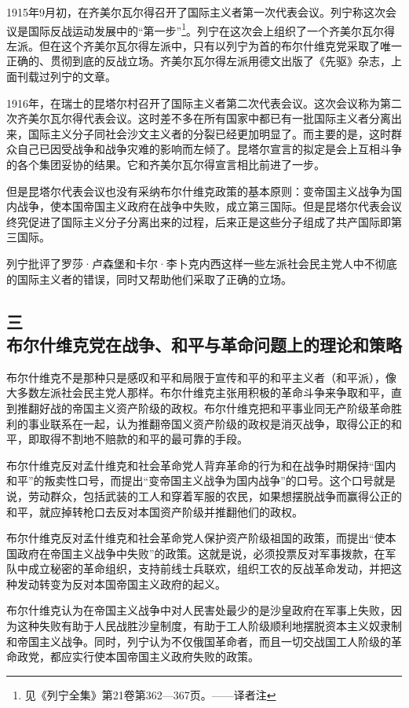 1915年9月初，在齐美尔瓦尔得召开了国际主义者第一次代表会议。列宁称这次会议是国际反战运动发展中的“第一步”\footnote{见《列宁全集》第21卷第362—367页。——译者注}。列宁在这次会上组织了一个齐美尔瓦尔得左派。但在这个齐美尔瓦尔得左派中，只有以列宁为首的布尔什维克党采取了唯一正确的、贯彻到底的反战立场。齐美尔瓦尔得左派用德文出版了《先驱》杂志，上面刊载过列宁的文章。

1916年，在瑞士的昆塔尔村召开了国际主义者第二次代表会议。这次会议称为第二次齐美尔瓦尔得代表会议。这时差不多在所有国家中都已有一批国际主义者分离出来，国际主义分子同社会沙文主义者的分裂已经更加明显了。而主要的是，这时群众自己已因受战争和战争灾难的影响而左倾了。昆塔尔宣言的拟定是会上互相斗争的各个集团妥协的结果。它和齐美尔瓦尔得宣言相比前进了一步。

但是昆塔尔代表会议也没有采纳布尔什维克政策的基本原则：变帝国主义战争为国内战争，使本国帝国主义政府在战争中失败，成立第三国际。但是昆塔尔代表会议终究促进了国际主义分子分离出来的过程，后来正是这些分子组成了共产国际即第三国际。

列宁批评了罗莎·卢森堡和卡尔·李卜克内西这样一些左派社会民主党人中不彻底的国际主义者的错误，同时又帮助他们采取了正确的立场。


\subsection[三\q 布尔什维克党在战争、和平与革命问题上的理论和策略]{三\\布尔什维克党在战争、和平与革命问题上的理论和策略}

布尔什维克不是那种只是感叹和平和局限于宣传和平的和平主义者（和平派），像大多数左派社会民主党人那样。布尔什维克主张用积极的革命斗争来争取和平，直到推翻好战的帝国主义资产阶级的政权。布尔什维克把和平事业同无产阶级革命胜利的事业联系在一起，认为推翻帝国义资产阶级的政权是消灭战争，取得公正的和平，即取得不割地不赔款的和平的最可靠的手段。

布尔什维克反对孟什维克和社会革命党人背弃革命的行为和在战争时期保持“国内和平”的叛卖性口号，而提出“变帝国主义战争为国内战争”的口号。这个口号就是说，劳动群众，包括武装的工人和穿着军服的农民，如果想摆脱战争而赢得公正的和平，就应掉转枪口去反对本国资产阶级并推翻他们的政权。

布尔什维克反对孟什维克和社会革命党人保护资产阶级祖国的政策，而提出“使本国政府在帝国主义战争中失败”的政策。这就是说，必须投票反对军事拨款，在军队中成立秘密的革命组织，支持前线士兵联欢，组织工农的反战革命发动，并把这种发动转变为反对本国帝国主义政府的起义。

布尔什维克认为在帝国主义战争中对人民害处最少的是沙皇政府在军事上失败，因为这种失败有助于人民战胜沙皇制度，有助于工人阶级顺利地摆脱资本主义奴隶制和帝国主义战争。同时，列宁认为不仅俄国革命者，而且一切交战国工人阶级的革命政党，都应实行使本国帝国主义政府失败的政策。

